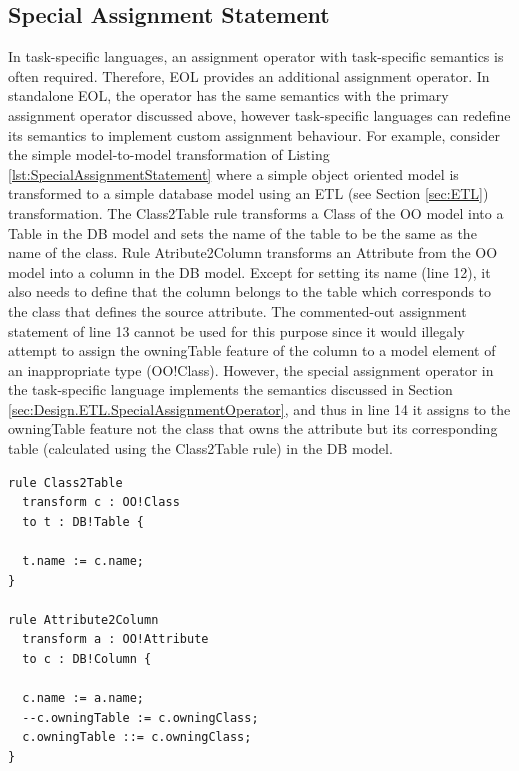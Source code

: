 \subsection{Special Assignment Statement}
\label{sec:Design.EOL.SpecialAssignmentStatement}
In task-specific languages, an assignment operator with task-specific semantics is often required. Therefore, EOL provides an additional assignment operator. In standalone EOL, the operator has the same semantics with the primary assignment operator discussed above, however task-specific languages can redefine its semantics to implement custom
assignment behaviour. For example, consider the simple model-to-model transformation of Listing \ref{lst:SpecialAssignmentStatement} where a simple object oriented model is transformed to a simple database model using an ETL (see Section \ref{sec:ETL}) transformation. The Class2Table rule transforms a Class of the OO model into
a Table in the DB model and sets the name of the table to be the same as the name of the class. Rule Atribute2Column transforms an Attribute from the OO model into a column in the DB model. Except for setting its name (line 12), it also needs to define that the column belongs to the table which corresponds to the class that defines the source attribute. The commented-out assignment statement of line 13 cannot
be used for this purpose since it would illegaly attempt to assign the owningTable feature of the column to a model element of an inappropriate type (OO!Class). However, the special assignment operator in the task-specific language implements the semantics discussed in Section \ref{sec:Design.ETL.SpecialAssignmentOperator}, and thus in line 14 it assigns to the owningTable feature not the class that owns the attribute but its corresponding table (calculated using the Class2Table rule) in the DB model. 

\begin{lstlisting}[basicstyle=\ttfamily\footnotesize, flexiblecolumns=true, numbers=none, nolol=true, caption=A simple model-to-model transformation
demonstrating the special assignment statement, label=lst:SpecialAssignmentStatement, numbers=left, language=ETL, tabsize=2]
rule Class2Table
  transform c : OO!Class
  to t : DB!Table {
  
  t.name := c.name;
}

rule Attribute2Column
  transform a : OO!Attribute
  to c : DB!Column {
  
  c.name := a.name;
  --c.owningTable := c.owningClass;
  c.owningTable ::= c.owningClass;
}

\end{lstlisting}

